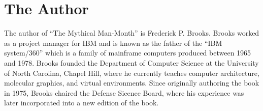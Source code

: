 \section{The Author}
The author of ``The Mythical Man-Month'' is Frederick P. Brooks.  Brooks worked as a project manager for IBM and is known as the father of the ``IBM system/360'' which is a family of mainframe computers produced between 1965 and 1978.  Brooks founded the Department of Computer Science at the University of North Carolina, Chapel Hill, where he currently teaches computer architecture, molecular graphics, and virtual environments.  Since originally authoring the book in 1975, Brooks chaired the Defense Sicence Board, where his experience was later incorporated into a new edition of the book. 
